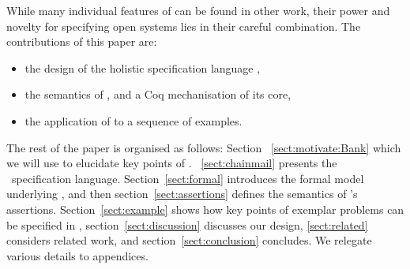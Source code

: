 
While many individual features of \Chainmail can be found in other work, 
their power and novelty for specifying open systems lies in their careful combination.
The contributions of this paper are:
\begin{itemize}
\item the design of the holistic specification language \Chainmail,
\item the semantics of \Chainmail, and a Coq mechanisation of its core,
\item the application of \Chainmail  to a sequence of examples.
\end{itemize}  
  
  
The rest of the paper is organised as follows:
Section
~\ref{sect:motivate:Bank} 
 which we will use 
to elucidate key points of \Chainmail.
~\ref{sect:chainmail} presents the \Chainmail\ specification
language.  Section~\ref{sect:formal} introduces the formal model
underlying \Chainmail, and then section~\ref{sect:assertions} defines
the 
semantics of \Chainmail's assertions.
Section~\ref{sect:example} shows how key points of 
exemplar problems can be specified in \Chainmail,
section~\ref{sect:discussion}
discusses our design, \ref{sect:related} considers related
work, and section~\ref{sect:conclusion} concludes.
We relegate various details to appendices.
